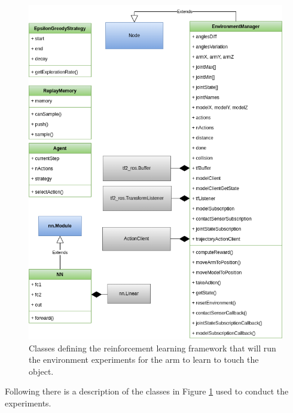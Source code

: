 \documentclass[12pt,oneside]{article}
\begin{document}
\begin{figure}[H]
\centering
\includegraphics[width=0.95\linewidth]{uml_diagram_complete}
\caption{Classes defining the reinforcement learning framework that will run the environment experiments for the arm to learn to touch the object.}
\label{fig:classdiagramcomplete}
\end{figure}
Following there is a description of the classes in Figure \ref{fig:classdiagramcomplete} used to conduct the experiments.
\end{document}
